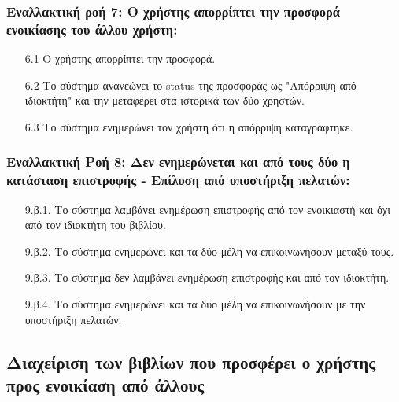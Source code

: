 \documentclass[12pt,a4paper]{article}
\begin{document}
\subsubsection*{Εναλλακτική ροή 7: Ο χρήστης απορρίπτει την προσφορά ενοικίασης του άλλου χρήστη:}
\begin{enumerate}
    \item [6.1] Ο χρήστης απορρίπτει την προσφορά.
    \item [6.2] Το σύστημα ανανεώνει το status της προσφοράς ως "Απόρριψη από ιδιοκτήτη" και την μεταφέρει στα ιστορικά των δύο χρηστών.
    \item [6.3] Το σύστημα ενημερώνει τον χρήστη ότι η απόρριψη καταγράφτηκε.
\end{enumerate}


\subsubsection*{Εναλλακτική Ροή 8: Δεν ενημερώνεται και από τους δύο η κατάσταση επιστροφής - Επίλυση από υποστήριξη πελατών:}
\begin{enumerate}
    \item[9.β.1.] Το σύστημα λαμβάνει ενημέρωση επιστροφής από τον ενοικιαστή και όχι από τον ιδιοκτήτη του βιβλίου.
    \item[9.β.2.] Το σύστημα ενημερώνει και τα δύο μέλη να επικοινωνήσουν μεταξύ τους.
    \item[9.β.3.] Το σύστημα δεν λαμβάνει ενημέρωση επιστροφής και από τον ιδιοκτήτη.
    \item[9.β.4.] Το σύστημα ενημερώνει και τα δύο μέλη να επικοινωνήσουν με την υποστήριξη πελατών.
\end{enumerate}

\subsection{Διαχείριση των βιβλίων που προσφέρει ο χρήστης προς ενοικίαση από άλλους}
\end{document}

